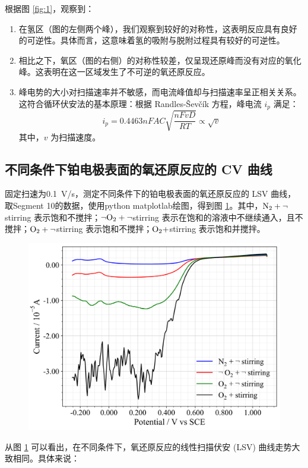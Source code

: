 根据图 \ref{fig:1}，观察到：
\begin{enumerate}
    \item 在氢区（图的左侧两个峰），我们观察到较好的对称性，这表明反应具有良好的可逆性。具体而言，这意味着氢的吸附与脱附过程具有较好的可逆性。
    \item 相比之下，氧区（图的右侧）的对称性较差，仅呈现还原峰而没有对应的氧化峰。这表明在这一区域发生了不可逆的氧还原反应。
    \item 峰电势的大小对扫描速率并不敏感，而电流峰值却与扫描速率呈正相关关系。这符合循环伏安法的基本原理：根据 Randles-Ševčík 方程，峰电流 $i_p$ 满足：
    $$
    i_p=0.4463 n F A C \sqrt{\frac{n F v D}{R T}} \propto \sqrt{v}
    $$
    其中，$v$ 为扫描速度。
\end{enumerate}

\subsection{不同条件下铂电极表面的氧还原反应的 CV 曲线}

固定扫速为\SI{0.1}{V/s}，测定不同条件下的铂电极表面的氧还原反应的 LSV 曲线，取Segment 10的数据，使用python matplotlab绘图，得到图 \ref{fig:2}。其中，$\ce{N2}+\neg$stirring 表示饱和不搅拌；$\neg\ce{O2}+\neg$stirring 表示在饱和的溶液中不继续通入，且不搅拌；$\ce{O2}+\neg$stirring 表示饱和不搅拌；$\ce{O2}+$stirring 表示饱和并搅拌。

\begin{figure}[htbp]
    \centering
    \includegraphics[width=.75\textwidth]{figures2/2.png}
    \label{fig:2}
\end{figure}

从图 \ref{fig:2} 可以看出，在不同条件下，氧还原反应的线性扫描伏安 (LSV) 曲线走势大致相同。具体来说：


